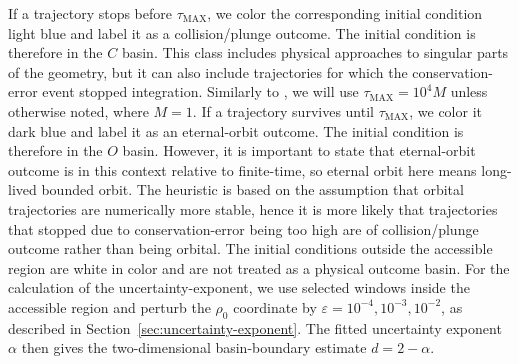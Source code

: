 If a trajectory stops before \(\tau_{\mathrm{MAX}}\), we color the corresponding
initial condition light blue and label it as a collision/plunge outcome. The initial condition is therefore in the $C$ basin. This
class includes physical approaches to singular parts of the geometry, but it can
also include trajectories for which the conservation-error event stopped
integration. Similarly to \cite{Sychrovsky2020}, we will use \(\tau_{\mathrm{MAX}} = 10^4M\) unless otherwise noted, where $M=1$. If a trajectory survives until \(\tau_{\mathrm{MAX}}\), we color it
dark blue and label it as an eternal-orbit outcome. The initial condition is therefore in the $O$ basin. However, it is important to state that eternal-orbit outcome is in this context relative to finite-time, so eternal orbit here means long-lived bounded orbit. The heuristic is based on the assumption that orbital trajectories are numerically more stable, hence it is more likely that trajectories that stopped due to conservation-error being too high are of collision/plunge outcome rather than being orbital. The initial conditions outside
the accessible region are white in color and are not treated as a physical
outcome basin. For the calculation of the uncertainty-exponent, we use selected windows
inside the accessible region and perturb the \(\rho_0\) coordinate by
\(\varepsilon=10^{-4},10^{-3},10^{-2}\), as described in
Section~\ref{sec:uncertainty-exponent}. The fitted uncertainty exponent
\(\alpha\) then gives the two-dimensional basin-boundary estimate \(d=2-\alpha\).
